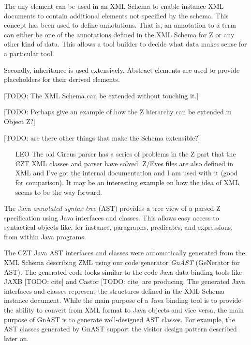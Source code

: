 \documentclass{llncs}
\begin{document}
  The any element can be used in an XML Schema to enable instance XML
  documents to contain additional elements not specified by the
  schema.  This concept has been used to define annotations.  That is,
  an annotation to a term can either be one of the annotations defined
  in the XML Schema for Z or any other kind of data.  This allows a
  tool builder to decide what data makes sense for a particular tool.

  Secondly, inheritance is used extensively.  Abstract elements are
  used to provide placeholders for their derived elements.

  [TODO: The XML Schema can be extended without touching it.]

  [TODO: Perhaps give an example of how the Z hierarchy can be
  extended in Object Z?]

  [TODO: are there other things that make the Schema extensible?]

  \begin{itemize}
    \item[LEO] The old Circus parser has a series of problems in the Z
      part that the CZT XML classes and parser have solved.  Z/Eves
      files are also defined in XML and I've got the internal
      documentation and I am used with it (good for comparison).  It
      may be an interesting example on how the idea of XML seems to be
      the way forward.
  \end{itemize}



  The Java \emph{annotated syntax tree} (AST) provides a tree view of
  a parsed Z specification using Java interfaces and classes.  This
  allows easy access to syntactical objects like, for instance,
  paragraphs, predicates, and expressions, from within Java programs.

  The CZT Java AST interfaces and classes were automatically generated
  from the XML Schema describing ZML using our code generator
  \emph{GnAST} (GeNerator for AST).  The generated code looks similar
  to the code Java data binding tools like JAXB [TODO: cite] and
  Castor [TODO: cite] are producing.  The generated Java interfaces
  and classes represent the structures defined in the XML Schema
  instance document.  While the main purpose of a Java binding tool is
  to provide the ability to convert from XML format to Java objects
  and vice versa, the main purpose of GnAST is to generate
  well-designed AST classes.  For example, the AST classes generated
  by GnAST support the visitor design pattern described later on.
\end{document}
